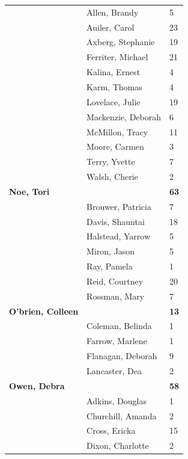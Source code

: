 \documentclass{article}\usepackage[]{graphicx}\usepackage[]{color}
\begin{document}
{\begin{longtable} { >{\raggedright}p{}|p{}p{}}
   & Allen, Brandy & 5 \\ 
   & Auiler, Carol & 23 \\ 
   \rowcolor[gray]{0.90} & Axberg, Stephanie & 19 \\ 
   \rowcolor[gray]{0.90} & Ferriter, Michael & 21 \\ 
   \rowcolor[gray]{0.90} & Kalina, Ernest & 4 \\ 
   & Karm, Thomas & 4 \\ 
   & Lovelace, Julie & 19 \\ 
   & Mackenzie, Deborah & 6 \\ 
   \rowcolor[gray]{0.90} & McMillon, Tracy & 11 \\ 
   \rowcolor[gray]{0.90} & Moore, Carmen & 3 \\ 
   \rowcolor[gray]{0.90} & Terry, Yvette & 7 \\ 
   & Walsh, Cherie & 2 \\ 
  \textbf{Noe, Tori} &  & \hspace{2cm}\textbf{63} \\ 
   & Brouwer, Patricia & 7 \\ 
   \rowcolor[gray]{0.90} & Davis, Shauntai & 18 \\ 
   \rowcolor[gray]{0.90} & Halstead, Yarrow & 5 \\ 
   \rowcolor[gray]{0.90} & Miron, Jason & 5 \\ 
   & Ray, Pamela & 1 \\ 
   & Reid, Courtney & 20 \\ 
   & Rossman, Mary & 7 \\ 
   \rowcolor[gray]{0.90}\textbf{O'brien, Colleen} &  & \hspace{2cm}\textbf{13} \\ 
   \rowcolor[gray]{0.90} & Coleman, Belinda & 1 \\ 
   \rowcolor[gray]{0.90} & Farrow, Marlene & 1 \\ 
   & Flanagan, Deborah & 9 \\ 
   & Lancaster, Dea & 2 \\ 
  \textbf{Owen, Debra} &  & \hspace{2cm}\textbf{58} \\ 
   \rowcolor[gray]{0.90} & Adkins, Douglas & 1 \\ 
   \rowcolor[gray]{0.90} & Churchill, Amanda & 2 \\ 
   \rowcolor[gray]{0.90} & Cross, Ericka & 15 \\ 
   & Dixon, Charlotte & 2 \\ 

\end{longtable}}
\end{document}
